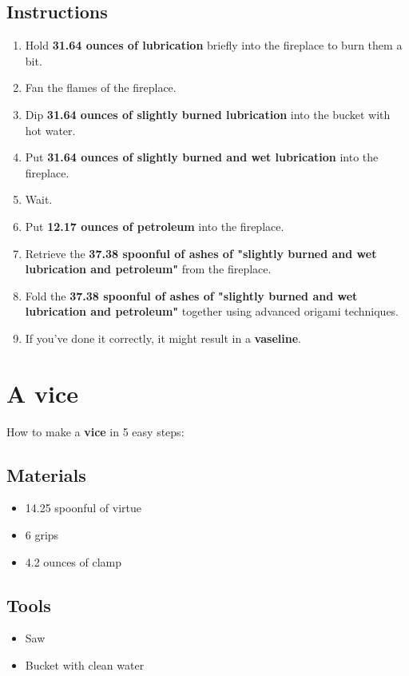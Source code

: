 \documentclass{article}
\begin{document}
\subsection{Instructions}\begin{enumerate}
\item 
Hold \textbf{31.64 ounces of lubrication} briefly into the fireplace to burn them a bit.
\item 
Fan the flames of the fireplace.
\item 
Dip \textbf{31.64 ounces of slightly burned lubrication} into the bucket with hot water.
\item 
Put \textbf{31.64 ounces of slightly burned and wet lubrication} into the fireplace.
\item 
Wait.
\item 
Put \textbf{12.17 ounces of petroleum} into the fireplace.
\item 
Retrieve the \textbf{37.38 spoonful of ashes of "slightly burned and wet lubrication and petroleum"} from the fireplace.
\item 
Fold the \textbf{37.38 spoonful of ashes of "slightly burned and wet lubrication and petroleum"} together using advanced origami techniques.
\item 
If you've done it correctly, it might result in a \textbf{vaseline}.
\end{enumerate}
\newpage
\section{A vice}How to make a \textbf{vice} in 5 easy steps:

\subsection{Materials}\begin{itemize}
\item 
14.25 spoonful of virtue
\item 
6 grips
\item 
4.2 ounces of clamp
\end{itemize}
\subsection{Tools}\begin{itemize}
\item 
Saw
\item 
Bucket with clean water
\end{itemize}
\end{document}
